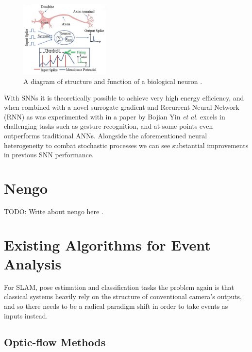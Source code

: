 \begin{figure}[htb]
      \centering
      \includegraphics[width=0.4\textwidth]{background/images/biological_neuron.png}
      \caption{A diagram of structure and function of a biological neuron \cite{BiologicalNeuronModel}.}
      \label{fig:biological_neuron}
\end{figure}

With SNNs it is theoretically possible to achieve very high energy efficiency, and when combined with a novel surrogate gradient and Recurrent Neural Network (RNN) as was experimented with in a paper by Bojian Yin \textit{et al.}\cite{EfficientSNN} excels in challenging tasks such as gesture recognition, and at some points even outperforms traditional ANNs. Alongside the aforementioned neural heterogeneity to combat stochastic processes we can see substantial improvements in previous SNN performance.

\section{Nengo} \label{sec:nengo}

\color{red} TODO: Write about nengo here \color{black}.

\section{Existing Algorithms for Event Analysis} \label{sec:existing_algorithms}

For SLAM, pose estimation and classification tasks the problem again is that classical systems heavily rely on the structure of conventional camera's outputs, and so there needs to be a radical paradigm shift in order to take events as inputs instead.

\subsection{Optic-flow Methods}

